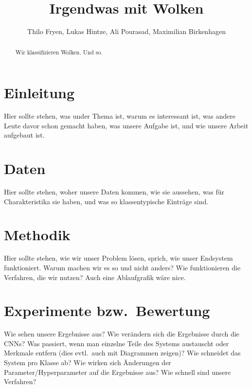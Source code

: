 \documentclass[a4,german]{article}
\begin{document}
\title{Irgendwas mit Wolken} %
\author{Thilo Fryen, Lukas Hintze, Ali Pourasad, Maximilian Birkenhagen} %

\maketitle %


\begin{abstract}
    Wir klassifizieren Wolken.
    Und so.
\end{abstract}

\section{Einleitung}

Hier sollte stehen, was under Thema ist, warum es interessant ist, was andere Leute davor schon gemacht haben,
was unsere Aufgabe ist, und wie unsere Arbeit aufgebaut ist.


\section{Daten}

Hier sollte stehen, woher unsere Daten kommen, wie sie aussehen, was für Charakteristika sie haben, und was so klassentypische Einträge sind.


\section{Methodik}

Hier sollte stehen, wie wir unser Problem lösen, sprich, wie unser Endsystem funktioniert.
Warum machen wir es so und nicht anders?
Wie funktionieren die Verfahren, die wir nutzen?
Auch eine Ablaufgrafik wäre nice.


\section{Experimente bzw.\ Bewertung}

Wie sehen unsere Ergebnisse aus?
Wie verändern sich die Ergebnisse durch die CNNs?
Was passiert, wenn man einzelne Teile des Systems austauscht oder Merkmale entfern (dies evtl.\ auch mit Diagrammen zeigen)?
Wie schneidet das System pro Klasse ab?
Wie wirken sich Änderungen der Parameter/Hyperpara\-meter auf die Ergebnisse aus?
Wie schnell sind unsere Verfahren?
\end{document}

